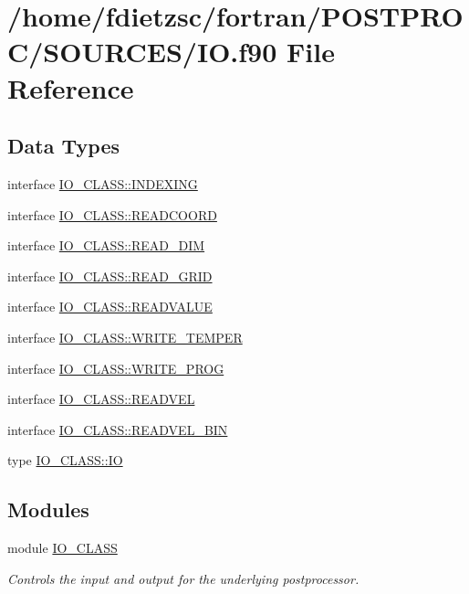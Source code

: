 \hypertarget{IO_8f90}{
\section{/home/fdietzsc/fortran/POSTPROC/SOURCES/IO.f90 File Reference}
\label{IO_8f90}
}
\subsection*{Data Types}
\begin{DoxyCompactItemize}
\item 
interface \hyperlink{interfaceIO__CLASS_1_1INDEXING}{IO\_\-CLASS::INDEXING}
\item 
interface \hyperlink{interfaceIO__CLASS_1_1READCOORD}{IO\_\-CLASS::READCOORD}
\item 
interface \hyperlink{interfaceIO__CLASS_1_1READ__DIM}{IO\_\-CLASS::READ\_\-DIM}
\item 
interface \hyperlink{interfaceIO__CLASS_1_1READ__GRID}{IO\_\-CLASS::READ\_\-GRID}
\item 
interface \hyperlink{interfaceIO__CLASS_1_1READVALUE}{IO\_\-CLASS::READVALUE}
\item 
interface \hyperlink{interfaceIO__CLASS_1_1WRITE__TEMPER}{IO\_\-CLASS::WRITE\_\-TEMPER}
\item 
interface \hyperlink{interfaceIO__CLASS_1_1WRITE__PROG}{IO\_\-CLASS::WRITE\_\-PROG}
\item 
interface \hyperlink{interfaceIO__CLASS_1_1READVEL}{IO\_\-CLASS::READVEL}
\item 
interface \hyperlink{interfaceIO__CLASS_1_1READVEL__BIN}{IO\_\-CLASS::READVEL\_\-BIN}
\item 
type \hyperlink{typeIO__CLASS_1_1IO}{IO\_\-CLASS::IO}
\end{DoxyCompactItemize}
\subsection*{Modules}
\begin{DoxyCompactItemize}
\item 
module \hyperlink{namespaceIO__CLASS}{IO\_\-CLASS}


\begin{DoxyCompactList}\small\item\em Controls the input and output for the underlying postprocessor. \end{DoxyCompactList}

\end{DoxyCompactItemize}
